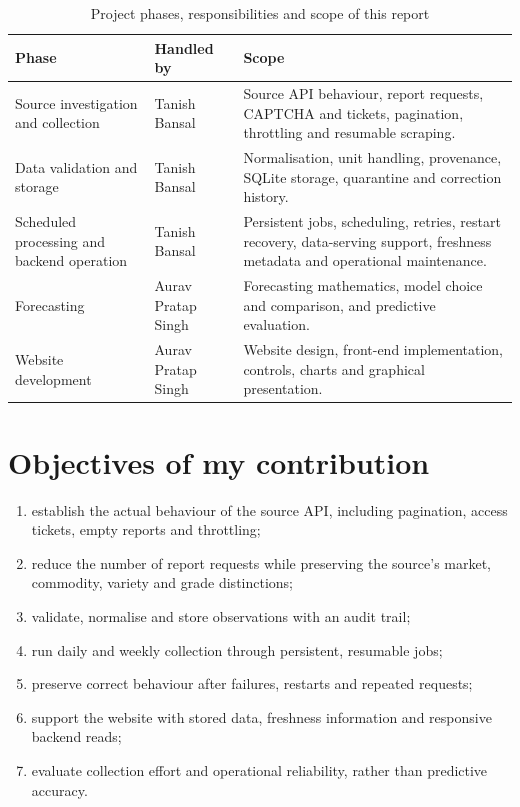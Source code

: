 \documentclass[12pt,a4paper,oneside]{report}
\newcommand{\studentname}{Tanish Bansal}
\newcommand{\auravname}{Aurav Pratap Singh}
\numberwithin{equation}{chapter}
\numberwithin{figure}{chapter}
\numberwithin{table}{chapter}
\theoremstyle{definition}
\begin{document}
\begin{table}[H]
\centering
\caption{Project phases, responsibilities and scope of this report}
\label{tab:division}
\small
\begin{tabular}{@{}p{}p{}p{}@{}}
\toprule
Phase & Handled by & Scope \\
\midrule
Source investigation and collection & \studentname & Source API behaviour, report requests, CAPTCHA and tickets, pagination, throttling and resumable scraping. \\
Data validation and storage & \studentname & Normalisation, unit handling, provenance, SQLite storage, quarantine and correction history. \\
Scheduled processing and backend operation & \studentname & Persistent jobs, scheduling, retries, restart recovery, data-serving support, freshness metadata and operational maintenance. \\
Forecasting & \auravname & Forecasting mathematics, model choice and comparison, and predictive evaluation. \\
Website development & \auravname & Website design, front-end implementation, controls, charts and graphical presentation. \\
\bottomrule
\end{tabular}
\end{table}

\section{Objectives of my contribution}
\begin{enumerate}
  \item establish the actual behaviour of the source API, including pagination, access tickets, empty reports and throttling;
  \item reduce the number of report requests while preserving the source's market, commodity, variety and grade distinctions;
  \item validate, normalise and store observations with an audit trail;
  \item run daily and weekly collection through persistent, resumable jobs;
  \item preserve correct behaviour after failures, restarts and repeated requests;
  \item support the website with stored data, freshness information and responsive backend reads;
  \item evaluate collection effort and operational reliability, rather than predictive accuracy.
\end{enumerate}
\end{document}
